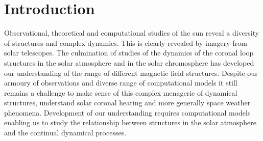 \documentclass{aastex62}
\begin{document}


\section{Introduction} \label{sec:intro}

Observational, theoretical and computational studies of the sun reveal a diversity of  structures and complex dynamics. This is clearly revealed by imagery from solar telescopes. The culmination of studies of the dynamics of the coronal loop structures  in the solar atmosphere and in the solar chromosphere has developed our understanding of the range of different magnetic field structures. %
Despite our armoury of observations and diverse range of computational models it still remains a challenge to make sense of this complex menagerie of dynamical structures, understand solar coronal heating and more generally space weather phenomena. Development of our understanding requires computational models enabling us to study the relationship between structures in the solar atmosphere and the continual dynamical processes.
\end{document}
